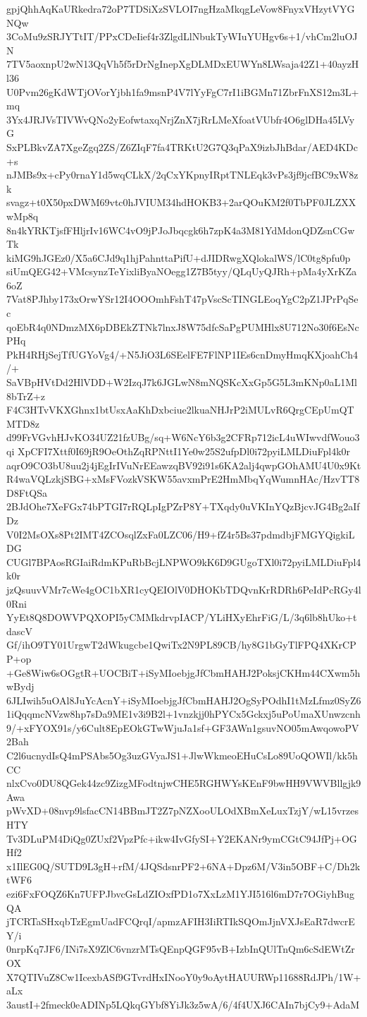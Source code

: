 gpjQhhAqKaURkedra72oP7TDSiXzSVLOI7ngHzaMkqgLeVow8FnyxVHzytVYGNQw
3CoMu9zSRJYTtIT/PPxCDeIief4r3ZlgdLlNbukTyWIuYUHgv6s+1/vhCm2luOJN
7TV5aoxnpU2wN13QqVh5f5rDrNgInepXgDLMDxEUWYn8LWsaja42Z1+40ayzHl36
U0Pvm26gKdWTjOVorYjbh1fa9msnP4V7lYyFgC7rI1iBGMn71ZbrFnXS12m3L+mq
3Yx4JRJVsTIVWvQNo2yEofwtaxqNrjZnX7jRrLMeXfoatVUbfr4O6glDHa45LVyG
SxPLBkvZA7XgeZgq2ZS/Z6ZIqF7fa4TRKtU2G7Q3qPaX9izbJhBdar/AED4KDc+s
nJMBs9x+cPy0rnaY1d5wqCLkX/2qCxYKpnyIRptTNLEqk3vPs3jf9jcfBC9xW8zk
svagz+t0X50pxDWM69vtc0hJVIUM34hdHOKB3+2arQOuKM2f0TbPF0JLZXXwMp8q
8n4kYRKTjsfFHljrIv16WC4vO9jPJoJbqcgk6h7zpK4a3M81YdMdonQDZsnCGwTk
kiMG9hJGEz0/X5a6CJd9q1hjPahnttaPifU+dJIDRwgXQlokalWS/lC0tg8pfu0p
siUmQEG42+VMcsynzTeYixliByaNOegg1Z7B5tyy/QLqUyQJRh+pMa4yXrKZa6oZ
7Vat8PJhby173xOrwYSr12I4OOOmhFshT47pVscScTINGLEoqYgC2pZ1JPrPqSec
qoEbR4q0NDmzMX6pDBEkZTNk7lnxJ8W75dfcSaPgPUMHlx8U712No30f6EsNcPHq
PkH4RHjSejTfUGYoVg4/+N5JiO3L6SEelFE7FlNP1IEs6cnDmyHmqKXjoahCh4/+
SaVBpHVtDd2HlVDD+W2IzqJ7k6JGLwN8mNQSKcXxGp5G5L3mKNp0aL1Ml8bTrZ+z
F4C3HTvVKXGhnx1btUsxAaKhDxbciue2lkuaNHJrP2iMULvR6QrgCEpUmQTMTD8z
d99FrVGvhHJvKO34UZ21fzUBg/sq+W6NcY6b3g2CFRp712icL4uWIwvdfWouo3qi
XpCFI7Xttf0I69jR9OeOthZqRPNttI1Ye0w25S2ufpDl0i72pyiLMLDiuFpl4k0r
aqrO9CO3bU8uu2j4jEgIrIVuNrEEawzqBV92i91s6KA2alj4qwpGOhAMU4U0x9Kt
R4waVQLzkjSBG+xMsFVozkVSKW55avxmPrE2HmMbqYqWumnHAc/HzvTT8D8FtQSa
2BJdOhe7XeFGx74bPTGI7rRQLpIgPZrP8Y+TXqdy0uVKInYQzBjcvJG4Bg2aIfDz
V0I2MsOXs8Pt2IMT4ZCOsqlZxFa0LZC06/H9+fZ4r5Bs37pdmdbjFMGYQigkiLDG
CUGl7BPAosRGIaiRdmKPuRbBcjLNPWO9kK6D9GUgoTXl0i72pyiLMLDiuFpl4k0r
jzQsuuvVMr7cWe4gOC1bXR1cyQEIOlV0DHOKbTDQvnKrRDRh6PeIdPcRGy4l0Rni
YyEt8Q8DOWVPQXOPI5yCMMkdrvpIACP/YLiHXyEhrFiG/L/3q6lb8hUko+tdascV
Gf/ihO9TY01UrgwT2dWkugcbe1QwiTx2N9PL89CB/hy8G1bGyTlFPQ4XKrCPP+op
+Ge8Wiw6sOGgtR+UOCBiT+iSyMIoebjgJfCbmHAHJ2PoksjCKHm44CXwm5hwBydj
6JLIwih5uOAl8JuYcAcnY+iSyMIoebjgJfCbmHAHJ2OgSyPOdhI1tMzLfmz0SyZ6
1iQqqmcNVzw8hp7sDa9ME1v3i9B2l+1vnzkjj0hPYCx5Gckxj5uPoUmaXUnwzcnh
9/+xFYOX91s/y6Cult8EpEOkGTwWjuJa1sf+GF3AWn1gsuvNO05mAwqowoPV2Bah
C2l6ucnydIsQ4mPSAbs5Og3uzGVyaJS1+JlwWkmeoEHuCsLo89UoQOWIl/kk5hCC
nlxCvo0DU8QGek44zc9ZizgMFodtnjwCHE5RGHWYsKEnF9bwHH9VWVBllgjk9Awa
pWvXD+08nvp9lsfacCN14BBmJT2Z7pNZXooULOdXBmXeLuxTzjY/wL15vrzesHTY
Tv3DLuPM4DiQg0ZUxf2VpzPfc+ikw4IvGfySI+Y2EKANr9ymCGtC94JfPj+OGHf2
x1IlEG0Q/SUTD9L3gH+rfM/4JQSdsnrPF2+6NA+Dpz6M/V3in5OBF+C/Dh2ktWF6
ezi6FxFOQZ6Kn7UFPJbvcGsLdZIOxfPD1o7XxLzM1YJI516l6mD7r7OGiyhBugQA
jTCRTaSHxqbTzEgmUadFCQrqI/apmzAFIH3IiRTIkSQOmJjnVXJsEaR7dwcrEY/i
0nrpKq7JF6/INi7sX9ZlC6vnzrMTsQEnpQGF95vB+IzbInQUlTnQm6cSdEWtZrOX
X7QTIVuZ8Cw1IcexbASf9GTvrdHxINooY0y9oAytHAUURWp11688RdJPh/1W+aLx
3austI+2fmeck0eADINp5LQkqGYbf8YiJk3z5wA/6/4f4UXJ6CAIn7bjCy9+AdaM
